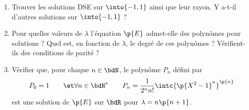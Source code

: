 \documentclass[a4paper,french,bookmarks]{article}
\begin{document}
    \begin{enumerate}
        \item Trouver les solutions DSE sur $\into{-1, 1}$ ainsi que leur rayon. Y a-t-il d'autres solutions sur $\into{-1, 1}$ ?
        
        \item Pour quelles valeurs de $\lambda$ l'équation $\p{E}$ admet-elle des polynômes pour solutions ? Quel est, en fonction de $\lambda$, le degré de ces polynômes ? Vérifient-ils des conditions de parité ?
        
        \item Vérifier que, pour chaque $n \in \bdN$, le polynôme $P_n$ défini par
        \[ P_0 = 1 \qquad\et\forall n \in \bdN^*\qquad P_n = \dfrac{1}{2^n n!}\intc{\p{X^2 - 1}^n}^{\p{n}} \]
        est une solution de $\p{E}$ sur $\bdR$ pour $\lambda = n\p{n+1}$.
        
    \end{enumerate}
\end{document}
